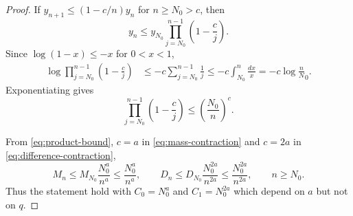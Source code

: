 \documentclass[10pt,a4paper]{amsart}
\begin{document}
\begin{proof}
If $y_{n+1}\leq(1-c/n)y_n$ for $n\geq N_0 >c$, then
\[
 y_n\leq y_{N_0}\prod_{j=N_0}^{n-1}\left(1-\frac cj\right).
\]
Since $\log(1-x)\leq-x$ for $0<x<1$,
\begin{align*}
 \log\prod_{j=N_0}^{n-1}\left(1-\frac cj\right)
 &\leq-c\sum_{j=N_0}^{n-1}\frac1j
 \leq-c\int_{N_0}^n\frac{dx}{x}
 =-c\log\frac nN_0.
\end{align*}
Exponentiating gives
\begin{equation}\label{eq:product-bound}
 \prod_{j=N_0}^{n-1}\left(1-\frac cj\right)\leq\left(\frac{N_0}{n}\right)^c.
\end{equation}

From \eqref{eq:product-bound}, $c=a$ in
\eqref{eq:mass-contraction} and
$c = 2a$ in \eqref{eq:difference-contraction}, 
\[
 M_n\leq M_{N_0} \frac{N_0^a}{n^a} \le \frac{N_0^a}{n^a}, \qquad
 D_n\leq D_{N_0} \frac{N_0^{2a}}{n^{2a}} \le \frac{N_0^{2a}}{n^{2a}},
 \qquad n\geq N_0.
\]
Thus the statement hold with $C_0 = N_0^a$ and $C_1 = N_0^{2a}$ which depend on $a$ but not on $q$.
\end{proof}
\end{document}

